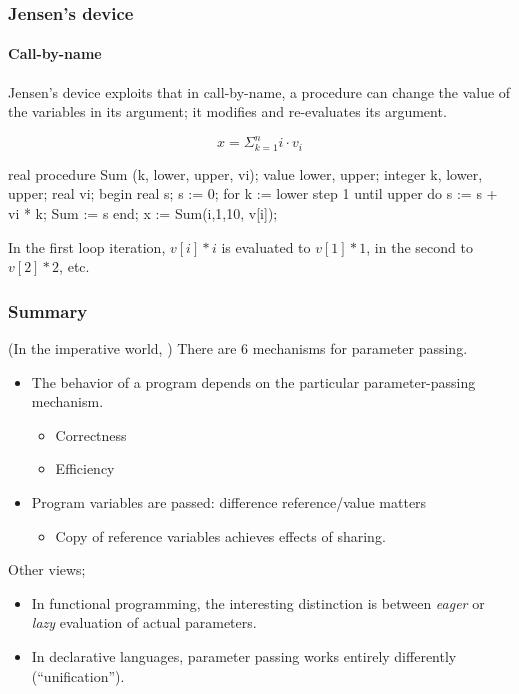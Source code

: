\documentclass{beamer}
\begin{document}
\begin{frame}[fragile]
\frametitle{Jensen's device}
\framesubtitle{Call-by-name}
Jensen's device exploits that in call-by-name, a procedure can change the 
value of the variables in its argument; it modifies and re-evaluates
its argument. 

\[
    x = \Sigma_{k=1}^{n} i\cdot v_i
\]
\begin{cplus3}
real procedure Sum (k, lower, upper, vi); 
   value lower, upper;  
   integer k, lower, upper; real vi; 
begin 
   real s; 
   s := 0; 
   for k := lower step 1 until upper do 
      s := s + vi * k; 
   Sum := s 
end;
x := Sum(i,1,10, v[i]);
\end{cplus3}
In the first loop iteration, $v[i]*i$ is evaluated to
$v[1]*1$, in the second to $v[2]*2$, etc. 

\end{frame}


\begin{frame}
\frametitle{Summary}
(In the imperative world, ) 
There are  6 mechanisms for parameter passing. 
\begin{itemize}
\item The behavior of a program depends on the particular parameter-passing
mechanism.
\begin{itemize}
\item Correctness
\item Efficiency
\end{itemize}
\item Program variables are passed: difference reference/value matters
\begin{itemize}
\item Copy of reference variables achieves effects of sharing.
\end{itemize}

\end{itemize}

Other views;
\begin{itemize}
\item In functional programming, the interesting distinction is between
\textit{eager} or \textit{lazy} evaluation of actual parameters. 
\item In declarative languages, parameter passing works entirely
differently (``unification'').
\end{itemize}

\end{frame}
\end{document}
